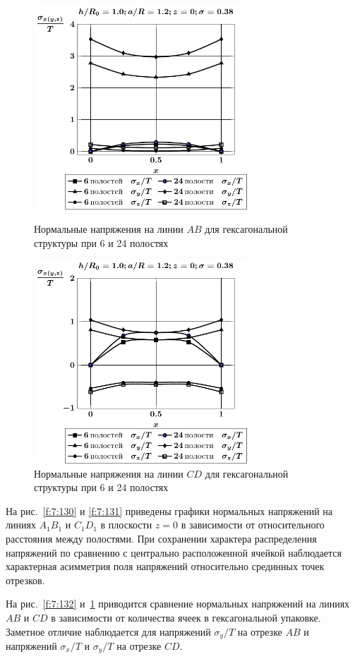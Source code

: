 \begin{figure}[h!]
\centering\footnotesize
\parbox[b]{7.5cm}{\centering\includegraphics[width=8cm]{cav24-6-a12-h10-r10-z0.pdf}
\caption{Нормальные напряжения на линии $AB$ для гексагональной структуры при 6 и 24 полостях
\label{f:7:132}}}\hfil\hfil
\parbox[b]{7.5cm}{\centering\includegraphics[width=8cm]{cav24-6-a12-h10-r10-z0-diag.pdf}
\caption{Нормальные напряжения на линии $CD$ для гексагональной структуры при 6 и 24 полостях
\label{f:7:133}}}
\end{figure}

На рис.~\ref{f:7:130} и \ref{f:7:131} приведены графики нормальных напряжений на линиях $A_1B_1$ и $C_1D_1$ в плоскости $z=0$ в зависимости от относительного расстояния между полостями. При сохранении характера распределения напряжений по сравнению с центрально расположенной ячейкой наблюдается характерная асимметрия поля напряжений относительно срединных точек отрезков.

На рис.~\ref{f:7:132} и~\ref{f:7:133} приводится сравнение нормальных напряжений на линиях $AB$ и $CD$ в зависимости от количества ячеек в гексагональной упаковке. Заметное отличие наблюдается для напряжений $\sigma_y/T$ на отрезке $AB$ и напряжений $\sigma_x/T$ и $\sigma_y/T$ на отрезке $CD$.

